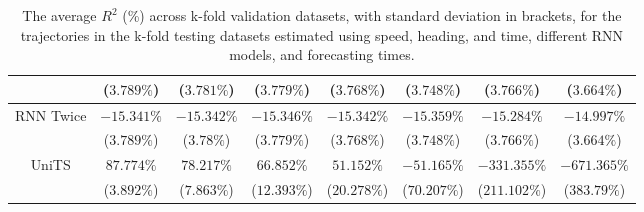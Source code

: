 \begin{table}[!ht]
{\begin{tabular}{|c|c|c|c|c|c|c|c|}
			 & ($3.789\%$) & ($3.781\%$) & ($3.779\%$) & ($3.768\%$) & ($3.748\%$) & ($3.766\%$) & ($3.664\%$) \\ \hline
			\multirow{2}{*}{RNN Twice} & $-15.341\%$ & $-15.342\%$ & $-15.346\%$ & $-15.342\%$ & $-15.359\%$ & $-15.284\%$ & $-14.997\%$ \\
			 & ($3.789\%$) & ($3.78\%$) & ($3.779\%$) & ($3.768\%$) & ($3.748\%$) & ($3.766\%$) & ($3.664\%$) \\ \hline
			\multirow{2}{*}{UniTS} & $87.774\%$ & $78.217\%$ & $66.852\%$ & $51.152\%$ & $-51.165\%$ & $-331.355\%$ & $-671.365\%$ \\
			 & ($3.892\%$) & ($7.863\%$) & ($12.393\%$) & ($20.278\%$) & ($70.207\%$) & ($211.102\%$) & ($383.79\%$) \\ \hline
		\end{tabular}
	}
	\caption{The average $R^{2}$ (\%) across k-fold validation datasets, with standard deviation in brackets, for the trajectories in the k-fold testing datasets estimated using speed, heading, and time, different RNN models, and forecasting times.}
	\label{tab:all_speed_actual_dir_R2}
\end{table}